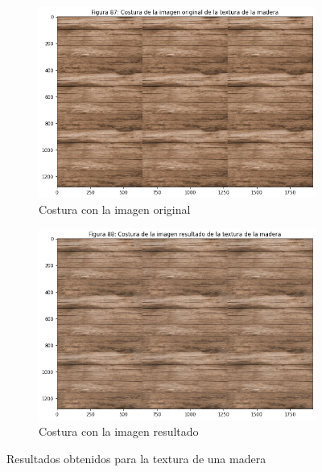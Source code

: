 \documentclass[11pt,twoside,titlepage,a4paper]{article}
\numberwithin{equation}{section} %
\theoremstyle{usual}
\begin{document}
\begin{figure}[h]
    \centering
    \begin{subfigure}[t]{.45\textwidth}
        \centering
        \includegraphics[width=\textwidth]{imagenes/PoissonImageEditing_cell_94_output_2.png}
        \caption{Costura con la imagen original}
        \label{fig:maderaCosturaOriginal}
    \end{subfigure}
    \centering
    \begin{subfigure}[t]{.45\textwidth}
        \centering
        \includegraphics[width=\textwidth]{imagenes/PoissonImageEditing_cell_94_output_3.png}
        \caption{Costura con la imagen resultado}
        \label{fig:maderaCosturaResultado}
    \end{subfigure}
    \caption{Resultados obtenidos para la textura de una madera}
    \label{fig:resultadosCosturaMadera}
\end{figure}
\end{document}
